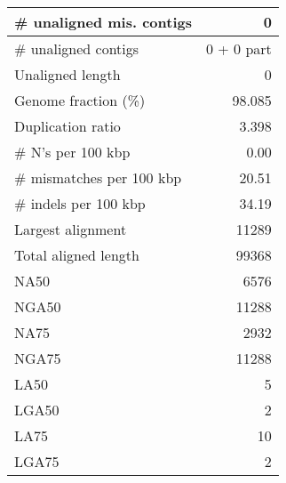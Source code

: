 \documentclass[12pt,a4paper]{article}
\begin{document}
\begin{table}[ht]
\begin{center}
\begin{tabular}{|l*{1}{|r}|}
\# unaligned mis. contigs & 0 \\ \hline
\# unaligned contigs & 0 + 0 part \\ \hline
Unaligned length & 0 \\ \hline
Genome fraction (\%) & 98.085 \\ \hline
Duplication ratio & 3.398 \\ \hline
\# N's per 100 kbp & 0.00 \\ \hline
\# mismatches per 100 kbp & 20.51 \\ \hline
\# indels per 100 kbp & 34.19 \\ \hline
Largest alignment & 11289 \\ \hline
Total aligned length & 99368 \\ \hline
NA50 & 6576 \\ \hline
NGA50 & 11288 \\ \hline
NA75 & 2932 \\ \hline
NGA75 & 11288 \\ \hline
LA50 & 5 \\ \hline
LGA50 & 2 \\ \hline
LA75 & 10 \\ \hline
LGA75 & 2 \\ \hline
\end{tabular}
\end{center}
\end{table}
\end{document}
